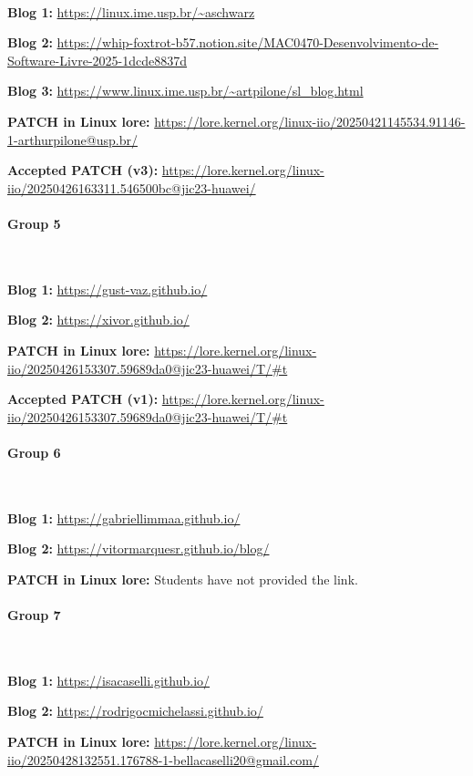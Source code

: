\

\textbf{Blog 1:} \url{https://linux.ime.usp.br/~aschwarz}

\textbf{Blog 2:} \url{https://whip-foxtrot-b57.notion.site/MAC0470-Desenvolvimento-de-Software-Livre-2025-1dcde8837d}

\textbf{Blog 3:} \url{https://www.linux.ime.usp.br/~artpilone/sl_blog.html}

\textbf{PATCH in Linux lore:} \url{https://lore.kernel.org/linux-iio/20250421145534.91146-1-arthurpilone@usp.br/}

\textbf{Accepted PATCH (v3):} \url{https://lore.kernel.org/linux-iio/20250426163311.546500bc@jic23-huawei/}

\paragraph{Group 5}

\

\textbf{Blog 1:} \url{https://gust-vaz.github.io/}

\textbf{Blog 2:} \url{https://xivor.github.io/}

\textbf{PATCH in Linux lore:} \url{https://lore.kernel.org/linux-iio/20250426153307.59689da0@jic23-huawei/T/#t}

\textbf{Accepted PATCH (v1):} \url{https://lore.kernel.org/linux-iio/20250426153307.59689da0@jic23-huawei/T/#t}

\paragraph{Group 6}

\

\textbf{Blog 1:} \url{https://gabriellimmaa.github.io/}

\textbf{Blog 2:} \url{https://vitormarquesr.github.io/blog/}

\textbf{PATCH in Linux lore:} Students have not provided the link.

\paragraph{Group 7}

\

\textbf{Blog 1:} \url{https://isacaselli.github.io/}

\textbf{Blog 2:} \url{https://rodrigocmichelassi.github.io/}

\textbf{PATCH in Linux lore:} \url{https://lore.kernel.org/linux-iio/20250428132551.176788-1-bellacaselli20@gmail.com/}

